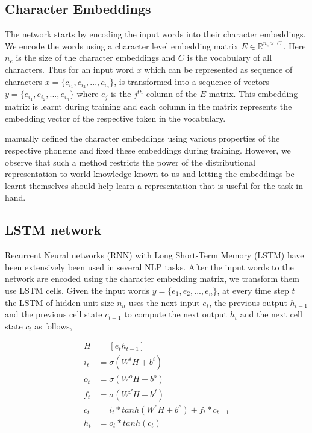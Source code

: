 \documentclass[11pt,letterpaper]{article}
\begin{document}
\subsection{Character Embeddings}

The network starts by encoding the input words into their character embeddings. We encode the words using a character level embedding matrix $E \in \mathbb{R}^{n_e \times |C|}$. Here $n_e$ is the size of the character embeddings and $C$ is the vocabulary of all characters. Thus for an input word $x$ which can be represented as sequence of characters $x = \{c_{i_1}, c_{i_2}, ..., c_{i_n}\}$, is transformed into a sequence of vectors $y = \{e_{i_1}, e_{i_2}, ..., e_{i_n}\}$ where $e_j$ is the $j^{th}$ column of the $E$ matrix. This embedding matrix is learnt during training and each column in the matrix represents the embedding vector of the respective token in the vocabulary. 

\citet{rama2016siamese} manually defined the character embeddings using various properties of the respective phoneme and fixed these embeddings during training. However, we observe that such a method restricts the power of the distributional representation to world knowledge known to us and letting the embeddings be learnt themselves should help learn a representation that is useful for the task in hand.

\subsection{LSTM network}

Recurrent Neural networks (RNN) with Long Short-Term Memory (LSTM) have been extensively been used in several NLP tasks. After the input words to the network are encoded using the character embedding matrix, we transform them use LSTM cells. Given the input words $y = \{e_1, e_2, ..., e_n\}$, at every time step $t$ the LSTM of hidden unit size $n_h$ uses the next input $e_t$, the previous output $h_{t-1}$ and the previous cell state $c_{t-1}$ to compute the next output $h_t$ and the next cell state $c_t$ as follows,

\begin{align}
H &= [e_t h_{t-1}] \\
i_t &= \sigma (W^iH + b^i) \\
o_t &= \sigma (W^oH + b^o) \\
f_t &= \sigma (W^fH + b^f) \\
c_t &= i_t * tanh(W^cH + b^c) + f_t * c_{t-1} \\
h_t &= o_t * tanh(c_t)
\end{align}
\end{document}
